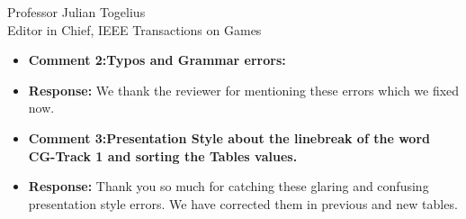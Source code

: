 \documentclass[10pt]{letter} %
\begin{document}
\begin{letter}{Professor Julian Togelius \\ Editor in Chief, IEEE Transactions on Games}
\begin{enumerate}
\begin{itemize}
		We have added this text to the paper in order to clarify what we
		understand by fitnessless:
		{\em Although this selection uses a score that could be assimilated to a fitness, it is actually an extension of a tournament selection policy since it creates tournaments of several individuals, and ``scores'' them according to how they fare in these races. This is not actually a fitness, since it is not intrinsic to the individual. It is indeed equivalent to, in a $n$-tournament selection that is repeated several times, giving a score of $n$ to the first, $n-1$ to the second, and then using this for selection. That score is, thus, not a fitness but actually a way of keeping track of the position of the individual in the different tournaments it has participated; since, in this context, we have no way of evaluating (i.e. assigning a fitness) to a controller but only a way to compare them, we call this approach {\em fitnessless}, as it was called, for instance, in [18].}
		\item {\bf Comment 2:Typos and Grammar errors:}
		\item {\bf Response:} We thank the reviewer for mentioning these errors which we fixed now. 
		\item {\bf Comment 3:Presentation Style about the linebreak of the word CG-Track 1 and sorting the Tables values.}
		\item {\bf Response:} Thank you so much for catching these glaring and confusing presentation style errors. We have corrected them in previous and new tables.
              \end{itemize}





\end{enumerate}
\end{letter}
\end{document}
